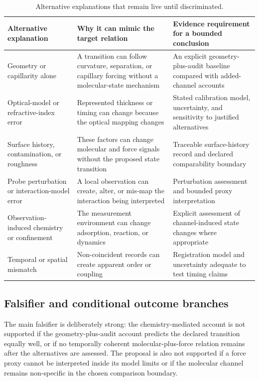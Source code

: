 \documentclass[conference]{IEEEtran}
\begin{document}
\begin{table}[!t]
\caption{Alternative explanations that remain live until discriminated.}
\label{tab:alternatives}
\centering
\footnotesize
\begin{tabular}{L{0.21\textwidth}L{0.30\textwidth}L{0.35\textwidth}}
\toprule
Alternative explanation & Why it can mimic the target relation & Evidence requirement for a bounded conclusion \\
\midrule
Geometry or capillarity alone & A transition can follow curvature, separation, or capillary forcing without a molecular-state mechanism & An explicit geometry-plus-audit baseline compared with added-channel accounts \\
Optical-model or refractive-index error & Represented thickness or timing can change because the optical mapping changes & Stated calibration model, uncertainty, and sensitivity to justified alternatives \\
Surface history, contamination, or roughness & These factors can change molecular and force signals without the proposed state transition & Traceable surface-history record and declared comparability boundary \\
Probe perturbation or interaction-model error & A local observation can create, alter, or mis-map the interaction being interpreted & Perturbation assessment and bounded proxy interpretation \\
Observation-induced chemistry or confinement & The measurement environment can change adsorption, reaction, or dynamics & Explicit assessment of channel-induced state changes where appropriate \\
Temporal or spatial mismatch & Non-coincident records can create apparent order or coupling & Registration model and uncertainty adequate to test timing claims \\
\bottomrule
\end{tabular}
\end{table}

\subsection{Falsifier and conditional outcome branches}

The main falsifier is deliberately strong: the chemistry-mediated account is not supported if the geometry-plus-audit account predicts the declared transition equally well, or if no temporally coherent molecular-plus-force relation remains after the alternatives are assessed. The proposal is also not supported if a force proxy cannot be interpreted inside its model limits or if the molecular channel remains non-specific in the chosen comparison boundary.
\end{document}
